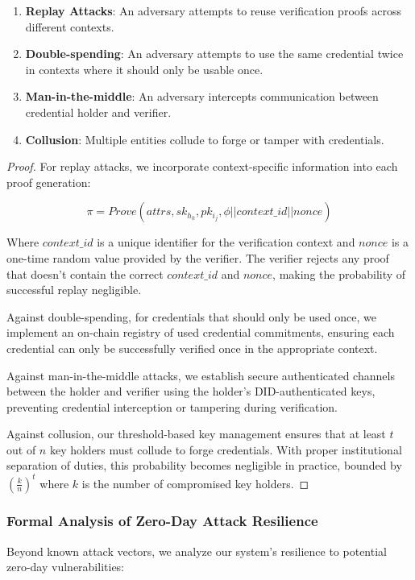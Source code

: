 \documentclass[lettersize,journal]{IEEEtran}
\begin{document}
\begin{itemize}
\begin{enumerate}
    \item \textbf{Replay Attacks}: An adversary attempts to reuse verification proofs across different contexts.
    
    \item \textbf{Double-spending}: An adversary attempts to use the same credential twice in contexts where it should only be usable once.
    
    \item \textbf{Man-in-the-middle}: An adversary intercepts communication between credential holder and verifier.
    
    \item \textbf{Collusion}: Multiple entities collude to forge or tamper with credentials.
\end{enumerate}

\begin{proof}
For replay attacks, we incorporate context-specific information into each proof generation:

$$\pi = Prove(attrs, sk_{h_k}, pk_{i_j}, \phi || context\_id || nonce)$$

Where $context\_id$ is a unique identifier for the verification context and $nonce$ is a one-time random value provided by the verifier. The verifier rejects any proof that doesn't contain the correct $context\_id$ and $nonce$, making the probability of successful replay negligible.

Against double-spending, for credentials that should only be used once, we implement an on-chain registry of used credential commitments, ensuring each credential can only be successfully verified once in the appropriate context.

Against man-in-the-middle attacks, we establish secure authenticated channels between the holder and verifier using the holder's DID-authenticated keys, preventing credential interception or tampering during verification.

Against collusion, our threshold-based key management ensures that at least $t$ out of $n$ key holders must collude to forge credentials. With proper institutional separation of duties, this probability becomes negligible in practice, bounded by $(\frac{k}{n})^t$ where $k$ is the number of compromised key holders.
\end{proof}

\subsubsection{Formal Analysis of Zero-Day Attack Resilience}
Beyond known attack vectors, we analyze our system's resilience to potential zero-day vulnerabilities:


\end{itemize}
\end{document}
